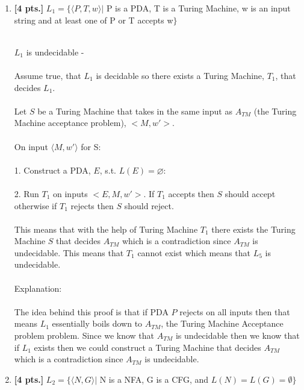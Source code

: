 \documentclass[11pt]{article}
\theoremstyle{definition}
\theoremstyle{theorem}
\newcommand{\solution}{\medskip\noindent{\color{blue}\textbf{Solution:}}}
\begin{document}
\begin{enumerate}[label=(\alph*)]


\item \textbf{[4 pts.]} $L_1 = \{ \langle P, T, w \rangle |$ P is a PDA, T is a Turing Machine, w is an input string and at least one of P or T accepts w$\}$

\solution \\
$L_1$ is undecidable - \\~\\
Assume true, that $L_1$ is decidable so there exists a Turing Machine, $T_1$, that decides $L_1$. \\~\\
\noindent Let $S$ be a Turing Machine that takes in the same input as $A_{TM}$ (the Turing Machine acceptance problem), $<M, w'>$. \\~\\
\noindent On input $\langle M, w' \rangle$ for S: \\~\\
1. Construct a PDA, $E$, s.t. $L(E) = \varnothing$: \\~\\
2. Run $T_1$ on inputs $<E, M, w'>$. If $T_1$ accepts then $S$ should accept otherwise if $T_1$ rejects then $S$ should reject. \\~\\
This means that with the help of Turing Machine $T_1$ there exists the Turing Machine $S$ that decides $A_{TM}$ which is a contradiction since $A_{TM}$ is undecidable. This means that $T_1$ cannot exist which means that $L_5$ is undecidable. \\~\\
Explanation: \\~\\
The idea behind this proof is that if PDA $P$ rejects on all inputs then that means $L_1$ essentially boils down to $A_{TM}$, the Turing Machine Acceptance problem problem. Since we know that $A_{TM}$ is undecidable then we know that if $L_1$ exists then we could construct a Turing Machine that decides $A_{TM}$ which is a contradiction since $A_{TM}$ is undecidable.


\newpage
\item \textbf{[4 pts.]} $L_2 = \{ \langle N, G \rangle |$ N is a NFA, G is a CFG, and $L(N) = L(G) = \emptyset \}$

\solution 


\end{enumerate}
\end{document}
